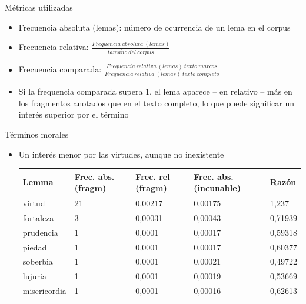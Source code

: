 \documentclass[11pt,aspectratio=169]{beamer}
\begin{document}
\begin{frame}{Métricas utilizadas}
\begin{center}
\begin{itemize}
\item Frecuencia absoluta (lemas): número de ocurrencia de un lema en el corpus
\item Frecuencia relativa: $\frac{Frequencia\ absoluta\ (lemas)}{tama\tilde{n}o\ del\ corpus}$
\item Frecuencia comparada: $\frac{Frequencia\ relativa\ (lemas)\ texto\ marcas}{Frequencia\ relativa\ (lemas)\ texto\ completo}$
\item Si la frequencia comparada supera 1, el lema aparece -- en relativo -- más en los fragmentos anotados que en el texto completo, lo que puede significar un interés superior por el término
\end{itemize}
\end{center}
\end{frame}



\begin{frame}{Términos morales}
\begin{center}

\begin{itemize}
\item Un interés menor por las virtudes, aunque no inexistente
\begin{table}[!ht]
    \centering
    \begin{tabular}{|l|l|l|l|l|}
    \hline
        \textbf{Lemma} & \textbf{Frec. abs. (fragm)} & \textbf{Frec. rel (fragm)} & \textbf{Frec. abs. (incunable)} & \textbf{Razón} \\ \hline
        virtud & 21 & 0,00217 & 0,00175 & 1,237 \\  \hhline{|=|=|=|=|=|} 
        fortaleza & 3 & 0,00031 & 0,00043 & 0,71939 \\ \hline
        prudencia & 1 & 0,0001 & 0,00017 & 0,59318 \\ \hline
        piedad & 1 & 0,0001 & 0,00017 & 0,60377 \\ \hline
        soberbia & 1 & 0,0001 & 0,00021 & 0,49722 \\ \hline
        lujuria & 1 & 0,0001 & 0,00019 & 0,53669 \\ \hline
        misericordia & 1 & 0,0001 & 0,00016 & 0,62613 \\ \hline
    \end{tabular}
\end{table}
\end{itemize}

\end{center}
\end{frame}
\end{document}
